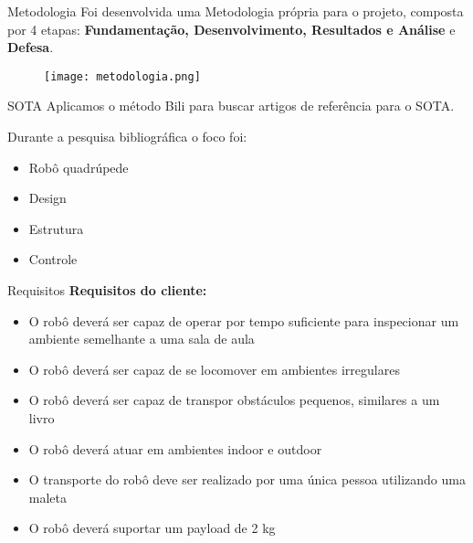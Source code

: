 \begin{frame}[t]{Metodologia}
    Foi desenvolvida uma Metodologia própria para o projeto, composta por 4 etapas: \textbf{Fundamentação, Desenvolvimento, Resultados e Análise} e \textbf{Defesa}.
    \begin{figure}
        \texttt{[image: metodologia.png]}
    \end{figure}
\end{frame}

\begin{frame}[t]{SOTA}
    Aplicamos o método Bili para buscar artigos de referência para o SOTA.

    Durante a pesquisa bibliográfica o foco foi:
    \begin{itemize}
        \item Robô quadrúpede
        \item Design
        \item Estrutura
        \item Controle
    \end{itemize}


\end{frame}

\begin{frame}[t]{Requisitos}
    \textbf{Requisitos do cliente:}
    \begin{itemize}
        \item O robô deverá ser capaz de operar por tempo suficiente para inspecionar um ambiente semelhante a uma sala de aula
        \item O robô deverá ser capaz de se locomover em ambientes irregulares
        \item O robô deverá ser capaz de transpor obstáculos pequenos, similares a um livro
        \item O robô deverá atuar em ambientes indoor e outdoor
        \item O transporte do robô deve ser realizado por uma única pessoa utilizando uma maleta
        \item O robô deverá suportar um payload de 2 kg
    \end{itemize}

\end{frame}

